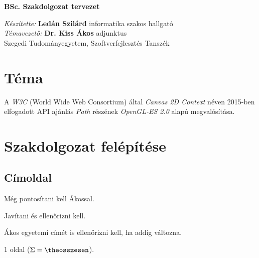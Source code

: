 \documentclass[12pt]{article}
\newcounter{osszesen}
\newcommand*{\oldalak}[1]{#1 oldal \setcounter{osszesen}{\theosszesen +
#1}($\Sigma=\theosszesen$)}
\begin{document}
\clearpage
\thispagestyle{empty}
\begin{center}

\vspace*{4.8cm}

{\LARGE\bf BSc. Szakdolgozat tervezet}

\vspace*{12cm}

{\large \raggedright
\emph{Készítette:} \textbf{Ledán Szilárd} informatika szakos hallgató\\
\emph{Témavezető:} \textbf{Dr. Kiss Ákos} adjunktus\\
Szegedi Tudományegyetem, Szoftverfejlesztés Tanszék\\
}
\end{center}

\clearpage


\tableofcontents


\section{Téma}

A \emph{W3C} (World Wide Web Consortium) által \emph{Canvas 2D Context} néven
2015-ben elfogadott API ajánlás \emph{Path} részének \emph{OpenGL-ES 2.0} alapú
megvalósítása.


\section{Szakdolgozat felépítése}

\subsection*{Címoldal}

\begin{description}[noitemsep]
  \item[Cím] Még pontosítani kell Ákossal.
  \item[Dátum] Javítani és ellenőrizni kell.
  \item[Témavezető] Ákos egyetemi címét is ellenőrizni kell, ha addig változna.
  \item[Oldalszám] \oldalak{1}.
\end{description}
\end{document}
